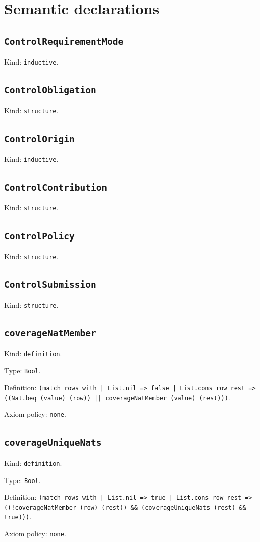 \documentclass[11pt]{article}
\begin{document}
\section*{Semantic declarations}
\subsection*{\texttt{ControlRequirementMode}}
\noindent Kind: \texttt{inductive}.\par
\subsection*{\texttt{ControlObligation}}
\noindent Kind: \texttt{structure}.\par
\subsection*{\texttt{ControlOrigin}}
\noindent Kind: \texttt{inductive}.\par
\subsection*{\texttt{ControlContribution}}
\noindent Kind: \texttt{structure}.\par
\subsection*{\texttt{ControlPolicy}}
\noindent Kind: \texttt{structure}.\par
\subsection*{\texttt{ControlSubmission}}
\noindent Kind: \texttt{structure}.\par
\subsection*{\texttt{coverageNatMember}}
\noindent Kind: \texttt{definition}.\par
\noindent Type: \texttt{Bool}.\par
\noindent Definition: \texttt{(match rows with | List.nil => false | List.cons row rest => ((Nat.beq (value) (row)) || coverageNatMember (value) (rest)))}.\par
\noindent Axiom policy: \texttt{none}.\par
\subsection*{\texttt{coverageUniqueNats}}
\noindent Kind: \texttt{definition}.\par
\noindent Type: \texttt{Bool}.\par
\noindent Definition: \texttt{(match rows with | List.nil => true | List.cons row rest => ((!coverageNatMember (row) (rest)) \&\& (coverageUniqueNats (rest) \&\& true)))}.\par
\noindent Axiom policy: \texttt{none}.\par
\end{document}
